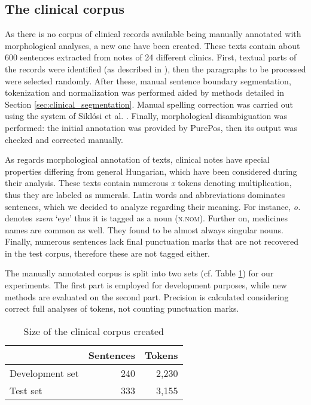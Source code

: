 \subsection{The clinical corpus}



As there is no corpus of clinical records available being manually annotated with morphological analyses, a new one have been created. 
These texts contain about 600 sentences extracted from notes of 24 different clinics. 
First, textual parts of the records were identified (as described in \cite{Siklosi2012}), then the paragraphs to be processed were selected randomly. 
After these, manual sentence boundary segmentation, tokenization and normalization was performed aided by methods detailed in Section \ref{sec:clinical_segmentation}. 
Manual spelling correction was carried out using the system of Siklósi et al. \cite{Siklosi2013}. 
Finally, morphological disambiguation was performed: the initial annotation was provided by PurePos, then its output was checked and corrected manually. 

As regards morphological annotation of texts, clinical notes have special properties differing from general Hungarian, which have been considered during their analysis. 
These texts contain numerous \textit{x} tokens denoting multiplication, thus they are labeled as numerals. 
Latin words and abbreviations dominates sentences, which we decided to analyze regarding their meaning. 
For instance, \textit{o.} denotes \textit{szem} `eye’ thus it is tagged as a noun (\textsc{n.nom}). 
Further on, medicines names are common as well. 
They found to be almost always singular nouns. 
Finally, numerous sentences lack final punctuation marks that are not recovered in the test corpus, therefore these are not tagged either. 

The manually annotated corpus is split into two sets (cf. Table \ref{tab:clin_corpus}) for our experiments. 
The first part is employed for development purposes, while new methods are evaluated on the second part.
Precision is calculated considering correct full analyses of tokens, not counting punctuation marks.

\begin{table}[H]
\centering
\caption{Size of the clinical corpus created}
\label{tab:clin_corpus}
\begin{tabular}{ l  r  r } 
\hline
& Sentences & Tokens \\
\hline
Development set & 240 & 2,230 \\
Test set & 333 & 3,155 \\
\hline
\end{tabular}
\end{table}


